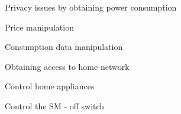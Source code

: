 Privacy issues by obtaining power consumption


Price manipulation


Consumption data manipulation


Obtaining access to home network


Control home appliances


Control the SM
- off switch
